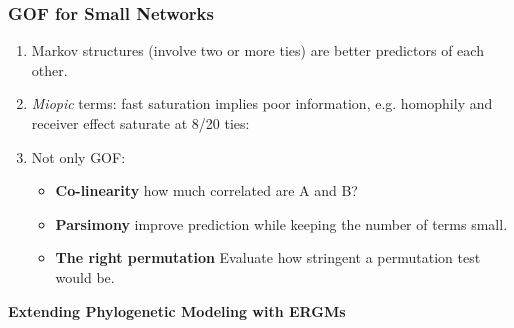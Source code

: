 \documentclass[aspectratio=169, 9pt, handout]{beamer}
\begin{document}
\begin{frame}[c]
\frametitle{GOF for Small Networks}


\begin{enumerate}
	\item Markov structures (involve two or more ties) are better predictors of each other.
	\item \textit{Miopic} terms: fast saturation implies poor information, e.g. homophily and receiver effect saturate at 8/20 ties:
	\begin{figure}
	\centering
	{\footnotesize{}
	
	}
	\end{figure}
	\vspace{.5cm}
	\item Not only GOF:
	\begin{itemize}
		\item \textbf{Co-linearity} how much correlated are A and B?
		\item \textbf{Parsimony} improve prediction while keeping the number of terms small.
		\item \textbf{The right permutation} Evaluate how stringent a permutation test would be.
	\end{itemize}
\end{enumerate}



\end{frame}


\begin{frame}[c]
	\textcolor{uscgold}{
		\Large {\bf Extending Phylogenetic Modeling with ERGMs}
	}
\end{frame}
\end{document}
